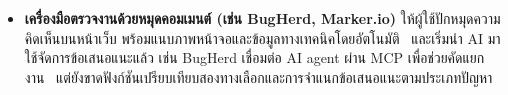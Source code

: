 {\begin{itemize}
    \item \textbf{เครื่องมือตรวจงานด้วยหมุดคอมเมนต์ (เช่น BugHerd, Marker.io)} ให้ผู้ใช้ปักหมุดความคิดเห็นบนหน้าเว็บ พร้อมแนบภาพหน้าจอและข้อมูลทางเทคนิคโดยอัตโนมัติ~\cite{bugherd,markerio} และเริ่มนำ AI มาใช้จัดการข้อเสนอแนะแล้ว เช่น BugHerd เชื่อมต่อ AI agent ผ่าน MCP เพื่อช่วยคัดแยกงาน~\cite{bugherd_ai} แต่ยังขาดฟังก์ชันเปรียบเทียบสองทางเลือกและการจำแนกข้อเสนอแนะตามประเภทปัญหา
  \end{itemize}
}
